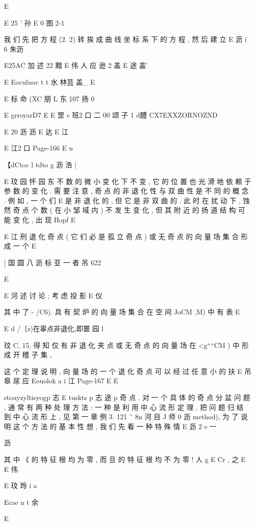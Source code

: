 {{{{{{{{{{{{{{{{{E

E
25
'
孙
E
0
图 2-1

我 们 先 把 方 程 (2. 2) 转 挨 成 曲 线 坐 标 系 下 的 方 程 , 然 后 建 立
E 沥 i 6 朱沥

E25AC 加 述 22 黯 E 伟 人 应 逊 2 盖 E 途 盖′

E
Eoculuoc t t 水 林芸
盖_ E

E 标 命 (XC 朋 L 东 107 扬 0

E grroyarD7
E
E 罡 c 班2 口 二 00 颂 子 1
d醴 CX7EXXZORNOZND

E 20 沥 沥
E 达
E 江

E 江2 口
Page-166
E u

【dCtoc l tdto g 沥 浩 |

E 玟 园 怀 园 东 不
数 的 微 小 变 化 下 不 变 , 它 的 位 置 也 光 滑 地 依 赖 于 参 数 的 变 化 . 需
要 注 意 , 奇 点 的 非 退 化 性 与 双 曲 性 是 不 同 的 概 念 . 例 如 , 一 个 们
E
是 非 退 化 的 , 但 它 是 非 双 曲 的 . 此 时 在 扰 动 下 , 蚀 然 奇 点 个 数 ( 在
小 邹 域 内 ) 不 发 生 变 化 , 但 其 附 近 的 扬 道 结 构 可 能 变 化 , 出 现 Hopf
E

E 江 刑
退 化 奇 点 ( 它 们 必 是 孤 立 奇 点 ) 或 无 奇 点 的 向 量 场 集 合 形 成 一 个
E

[ 国 圆 八 沥 标 亚 一 者 吊 622

E

E 河 述
讨 论 ; 考 虑 投 影
E 仪

其 中 了 - /C6). 具 有 契 炉 的 向 量 场 集 合 在 空 间 JoCM ,M) 中 有 表
E

E
d
/〔z)在辜点非退化,即噩 园 l

玟
C, 15, 得 知 仅 有 非 退 化 夹 点 或 无 奇 点 的 向 量 场 在 <g““CM ) 中 形 成
开 稽 子 集 ,

这 个 定 理 说 明 , 向 量 场 的 一 个 退 化 奇 点 可 以 经 过 任 意 小 的 扶
E 吊 皋 尿 应
Eouolok a i 江
Page-167
E E

stouyzyltisyogp 志 E
tuskts p 志 途 p
奇 点 . 对 一 个 具 体 的 奇 点 分 盆 问 题 , 通 常 有 两 种 处 理 方 法 : 一 种 是
利 用 中 心 流 形 定 理 , 把 问 题 归 结 到 中 心 流 形 上 , 见 第 一 章 例 3. 121 ˇ
8n 河 目 J 师 0 沥
method), 为 了 说 明 这 个 方 法 的 基 本 性 想 , 我 们 先 看 一 种 特 殊 情
E 沥 2 e 一

沥

其 中 《 的 特 征 根 均 为 零 , 而 旦 的 特 征 根 均 不 为 零 ! 人 g E Cr , 之
E
E 伟

E 玟 玲
i
a

Ecae n t 余

E

}}}}}}}}}}}}}}}}}

